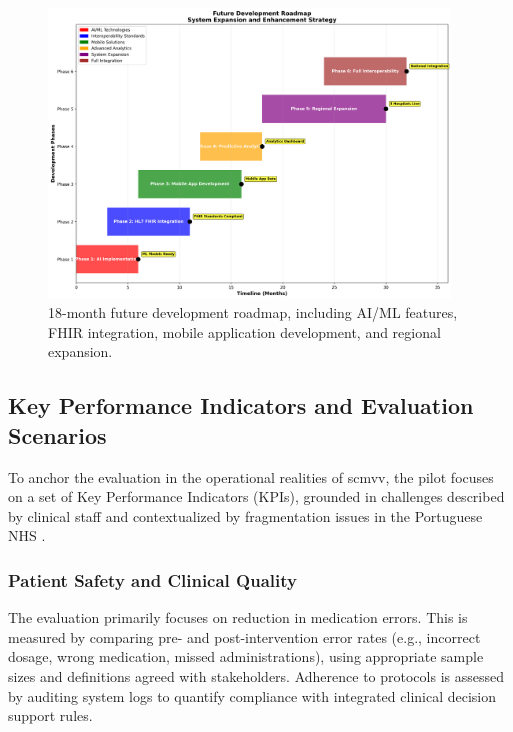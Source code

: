 \begin{figure}[htbp]
    \centering
    \includegraphics[width=0.95\textwidth]{images/generated/future_roadmap.png}
    \caption{18-month future development roadmap, including AI/ML features, FHIR integration, mobile application development, and regional expansion.}
    \label{fig:future-roadmap}
\end{figure}

\subsection{Key Performance Indicators and Evaluation Scenarios}
\label{sec:KPIs}

To anchor the evaluation in the operational realities of \gls{scmvv}, the pilot focuses on a set of Key Performance Indicators (KPIs), grounded in challenges described by clinical staff and contextualized by fragmentation issues in the Portuguese NHS \cite{goiana2024portuguese, nunes2021articulacao}.

\subsubsection{Patient Safety and Clinical Quality}
The evaluation primarily focuses on reduction in medication errors. This is measured by comparing pre- and post-intervention error rates (e.g., incorrect dosage, wrong medication, missed administrations), using appropriate sample sizes and definitions agreed with stakeholders. Adherence to protocols is assessed by auditing system logs to quantify compliance with integrated clinical decision support rules.

